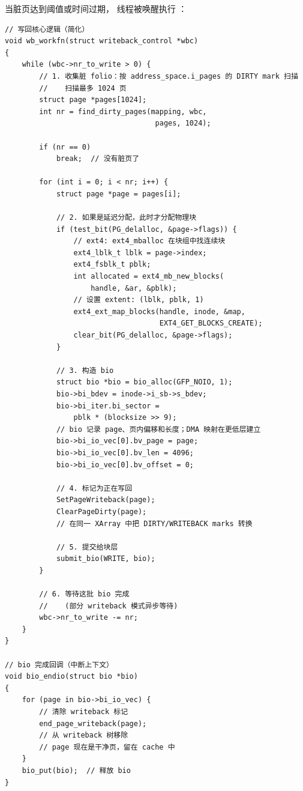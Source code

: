 \begin{filesystemlayout}

当脏页达到阈值或时间过期， 线程被唤醒执行 ：

\begin{lstlisting}
// 写回核心逻辑（简化）
void wb_workfn(struct writeback_control *wbc)
{
    while (wbc->nr_to_write > 0) {
        // 1. 收集脏 folio：按 address_space.i_pages 的 DIRTY mark 扫描
        //    扫描最多 1024 页
        struct page *pages[1024];
        int nr = find_dirty_pages(mapping, wbc,
                                   pages, 1024);

        if (nr == 0)
            break;  // 没有脏页了

        for (int i = 0; i < nr; i++) {
            struct page *page = pages[i];

            // 2. 如果是延迟分配，此时才分配物理块
            if (test_bit(PG_delalloc, &page->flags)) {
                // ext4: ext4_mballoc 在块组中找连续块
                ext4_lblk_t lblk = page->index;
                ext4_fsblk_t pblk;
                int allocated = ext4_mb_new_blocks(
                    handle, &ar, &pblk);
                // 设置 extent: (lblk, pblk, 1)
                ext4_ext_map_blocks(handle, inode, &map,
                                    EXT4_GET_BLOCKS_CREATE);
                clear_bit(PG_delalloc, &page->flags);
            }

            // 3. 构造 bio
            struct bio *bio = bio_alloc(GFP_NOIO, 1);
            bio->bi_bdev = inode->i_sb->s_bdev;
            bio->bi_iter.bi_sector =
                pblk * (blocksize >> 9);
            // bio 记录 page、页内偏移和长度；DMA 映射在更低层建立
            bio->bi_io_vec[0].bv_page = page;
            bio->bi_io_vec[0].bv_len = 4096;
            bio->bi_io_vec[0].bv_offset = 0;

            // 4. 标记为正在写回
            SetPageWriteback(page);
            ClearPageDirty(page);
            // 在同一 XArray 中把 DIRTY/WRITEBACK marks 转换

            // 5. 提交给块层
            submit_bio(WRITE, bio);
        }

        // 6. 等待这批 bio 完成
        //    (部分 writeback 模式异步等待)
        wbc->nr_to_write -= nr;
    }
}

// bio 完成回调（中断上下文）
void bio_endio(struct bio *bio)
{
    for (page in bio->bi_io_vec) {
        // 清除 writeback 标记
        end_page_writeback(page);
        // 从 writeback 树移除
        // page 现在是干净页，留在 cache 中
    }
    bio_put(bio);  // 释放 bio
}
\end{lstlisting}


\end{filesystemlayout}
